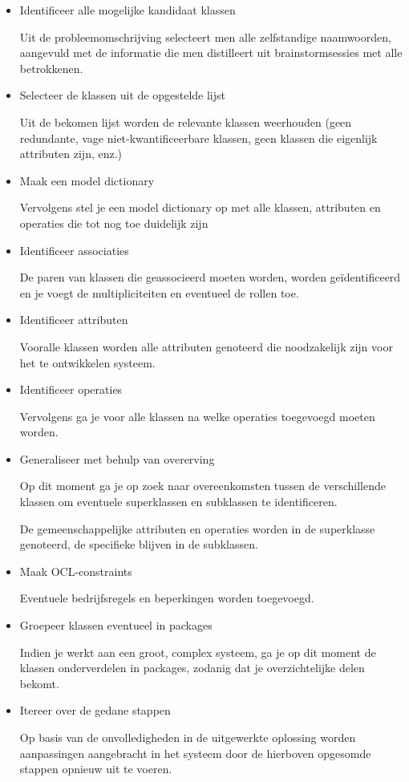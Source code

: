 \begin{itemize}
    \item Identificeer alle mogelijke kandidaat klassen
    
    Uit de probleemomschrijving selecteert men alle zelfstandige naamwoorden, aangevuld met de informatie die men distilleert uit brainstormsessies met alle betrokkenen.
    \item Selecteer de klassen uit de opgestelde lijst
    
    Uit de bekomen lijst worden de relevante klassen weerhouden (geen redundante, vage niet-kwantificeerbare klassen, geen klassen die eigenlijk attributen zijn, enz.)
    \item Maak een model dictionary
    
    Vervolgens stel je een model dictionary op met alle klassen, attributen en operaties die tot nog toe duidelijk zijn
    \item Identificeer associaties
    
    De paren van klassen die geassocieerd moeten worden, worden geïdentificeerd en je voegt de multipliciteiten en eventueel de rollen toe.
    \item Identificeer attributen
    
    Vooralle klassen worden alle attributen genoteerd die noodzakelijk zijn voor het te ontwikkelen systeem.
    \item Identificeer operaties
    
    Vervolgens ga je voor alle klassen na welke operaties toegevoegd moeten worden.
    \item Generaliseer met behulp van overerving
    
    Op dit moment ga je op zoek naar overeenkomsten tussen de verschillende klassen om eventuele superklassen en subklassen te identificeren.
    
    De gemeenschappelijke attributen en operaties worden in de superklasse genoteerd, de specifieke blijven in de subklassen.

\item Maak OCL-constraints

Eventuele bedrijfsregels en beperkingen worden toegevoegd.

\item Groepeer klassen eventueel in packages

Indien je werkt aan een groot, complex systeem, ga je op dit moment de klassen onderverdelen in packages, zodanig dat je overzichtelijke delen bekomt.
\item Itereer over de gedane stappen

Op basis van de onvolledigheden in de uitgewerkte oplossing worden aanpassingen aangebracht in het systeem door de hierboven opgesomde stappen opnieuw uit te voeren.
\end{itemize}

